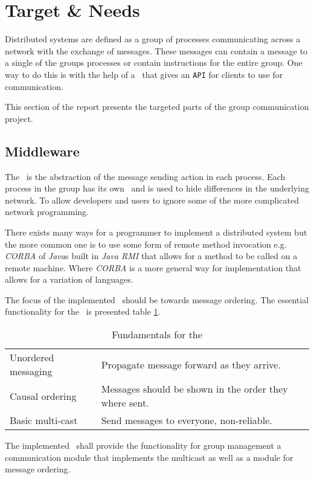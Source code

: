 \section{Target \& Needs}
Distributed systems are defined as a group of processes communicating across a network with the exchange of messages. These messages can contain a message to a single of the groups processes or contain instructions for the entire group. One way to do this is with the help of a \mw\ that gives an \texttt{API} for clients to use for communication. 

This section of the report presents the targeted parts of the group communication project.

\subsection{Middleware}
The \mw\ is the abstraction of the message sending action in each process. Each process in the group has its own \mw\ and is used to hide differences in the underlying network. To allow developers and users to ignore some of the more complicated network programming.

There exists many ways for a programmer to implement a distributed system but the more common one is to use some form of remote method invocation e.g. \textit{CORBA} of \textit{Java}s built in \textit{Java RMI} that allows for a method to be called on a remote machine. Where \textit{CORBA} is a more general way for implementation that allows for a variation of languages. 

The focus of the implemented \mw\ should be towards message ordering. The essential functionality for the \mw\ is presented table \ref{tab:fundamental}.

\begin{table}[h!]
	\begin{tabular}{l p{8cm}}
		Unordered messaging & Propagate message forward as they arrive. \\
		Causal ordering & Messages should be shown in the order they where sent. \\
		Basic multi-cast & Send messages to everyone, non-reliable. \\	
	\end{tabular}
	\caption{Fundamentals for the \mw}
	\label{tab:fundamental}
\end{table}

The implemented \mw\ shall provide the functionality for group management a communication module that implements the multicast as well as a module for message ordering. 

